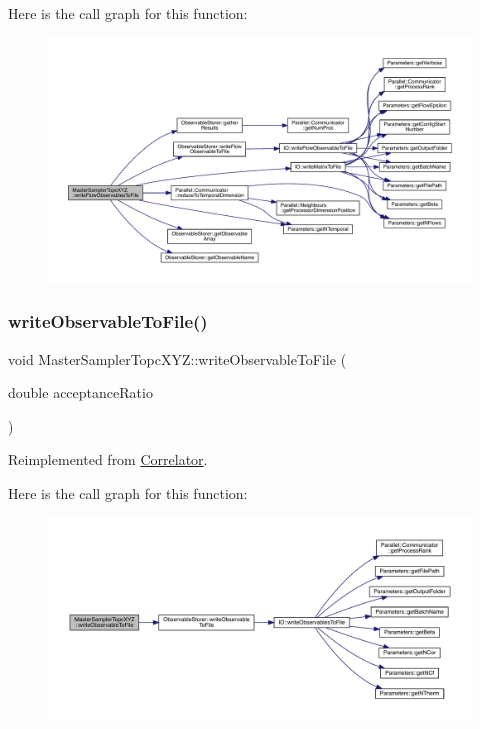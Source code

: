 Here is the call graph for this function\+:\nopagebreak
\begin{figure}[H]
\begin{center}
\leavevmode
\includegraphics[width=350pt]{class_master_sampler_topc_x_y_z_a4fba4290e4406e18ef3f2904c6ae364f_cgraph}
\end{center}
\end{figure}
\mbox{\label{class_master_sampler_topc_x_y_z_a930f13a2a13f4b3820f40c8b52110cf2}} 
\subsubsection{\texorpdfstring{writeObservableToFile()}{writeObservableToFile()}}
{\footnotesize\ttfamily void Master\+Sampler\+Topc\+X\+Y\+Z\+::write\+Observable\+To\+File (\begin{DoxyParamCaption}\item[{double}]{acceptance\+Ratio }\end{DoxyParamCaption})\hspace{0.3cm}{\ttfamily [virtual]}}



Reimplemented from \mbox{\hyperlink{class_correlator_a9e8d80e30e4fbe3b7fe57521538cb5ff}{Correlator}}.

Here is the call graph for this function\+:\nopagebreak
\begin{figure}[H]
\begin{center}
\leavevmode
\includegraphics[width=350pt]{class_master_sampler_topc_x_y_z_a930f13a2a13f4b3820f40c8b52110cf2_cgraph}
\end{center}
\end{figure}


